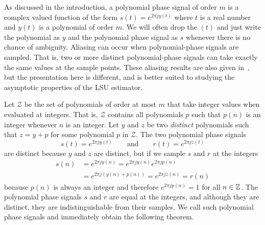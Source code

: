 \documentclass[journal]{IEEEtran}
\begin{document}
As discussed in the introduction, a polynomial phase signal of order $m$ is a complex valued function of the form $s(t) = e^{2\pi j y(t)}$ where $t$ is a real number and $y(t)$ is a polynomial of order $m$. We will often drop the $(t)$ and just write the polynomial as $y$ and the polynomial phase signal as $s$ whenever there is no chance of ambiguity. %
Aliasing can occur when polynomial-phase signals are sampled.  That is, two or more distinct polynomial-phase signals can take exactly the same values at the sample points.  These aliasing results are also given in~\cite{McKilliam2009IndentifiabliltyAliasingPolyphase}, but the presentation here is different, and is better suited to studying the asymptotic properties of the LSU estimator.  %

Let $\mathcal{Z}$ be the set of polynomials of order at most $m$ that take integer values when evaluated at integers. That is, $\mathcal{Z}$ contains all polynomials $p$ such that $p(n)$ is an integer whenever $n$ is an integer.
Let $y$ and $z$ be two \emph{distinct} polynomials such that $z = y + p$ for some polynomial $p$ in $\mathcal{Z}$. The two polynomial phase signals
\[
s(t) = e^{2\pi j y(t)} \qquad \text{and} \qquad r(t) = e^{2\pi j z(t)}
\]
are distinct because $y$ and $z$ are distinct, but if we sample $s$ and $r$ at the integers  
\begin{align*}
s(n) &= e^{2\pi j y(n)} =  e^{2\pi j y(n)} e^{2\pi j p(n)} \\
&= e^{2\pi j (y(n) + p(n))} = e^{2\pi j z(n)} = r(n)
\end{align*}
because $p(n)$ is always an integer and therefore $e^{2\pi j p(n)} = 1$ for all $n \in {\mathbb Z}$. The polynomial phase signals $s$ and $r$ are equal at the integers, and although they are distinct, they are indistinguishable from their samples. We call such polynomial phase signals  and immediately obtain the following theorem.
\end{document}
